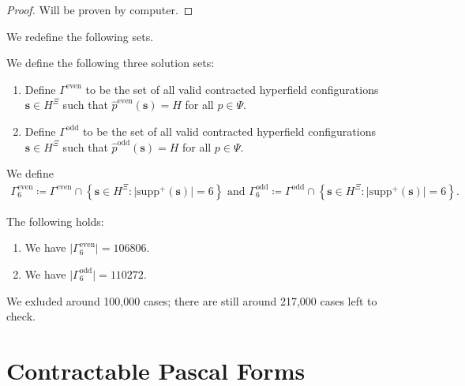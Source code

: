 \begin{proof}
    Will be proven by computer.
\end{proof}

We redefine the following sets.

\begin{definition}
    We define the following three solution sets:
    \begin{enumerate}
        \item     Define \( \Gamma^{\mathrm{even}} \) to be the set of all valid contracted hyperfield configurations \( \mathbf{s} \in H^{\Xi} \) such that \( \hat p^{\mathrm{even}}(\mathbf{s}) = H \) for all \( p \in \Psi \).

        \item     Define \( \Gamma^{\mathrm{odd}} \) to be the set of all valid contracted hyperfield configurations \( \mathbf{s} \in H^{\Xi} \) such that \( \hat p^{\mathrm{odd}}(\mathbf{s}) = H \) for all \( p \in \Psi \).
    \end{enumerate}
\end{definition}

\begin{definition}
    We define 
    \begin{gather*}
        \Gamma^{\mathrm{even}}_6 \coloneqq \Gamma^{\mathrm{even}} \cap \left\{ \mathbf{s} \in H^{\Xi} : \lvert \mathrm{supp}^+(\mathbf{s}) \rvert = 6 \right\}
        \text{ and }
        \Gamma^{\mathrm{odd}}_6 \coloneqq \Gamma^{\mathrm{odd}} \cap \left\{ \mathbf{s} \in H^{\Xi} : \lvert \mathrm{supp}^+(\mathbf{s}) \rvert = 6 \right\}.
    \end{gather*}
\end{definition}


\begin{proposition}
    The following holds:
    \begin{enumerate}
        \item We have \( \lvert \Gamma^{\mathrm{even}}_6 \rvert  = 106806\).
        \item We have \( \lvert \Gamma^{\mathrm{odd}}_6 \rvert  = 110272\).
    \end{enumerate}
\end{proposition}

We exluded around 100,000 cases; there are still around 217,000 cases left to check.

\section{Contractable Pascal Forms}

